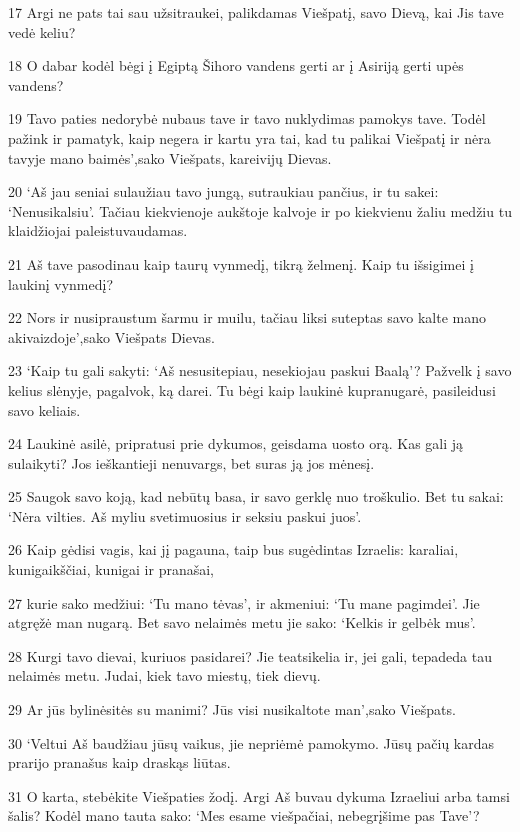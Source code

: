 \par 17 Argi ne pats tai sau užsitraukei, palikdamas Viešpatį, savo Dievą, kai Jis tave vedė keliu? 
\par 18 O dabar kodėl bėgi į Egiptą Šihoro vandens gerti ar į Asiriją gerti upės vandens? 
\par 19 Tavo paties nedorybė nubaus tave ir tavo nuklydimas pamokys tave. Todėl pažink ir pamatyk, kaip negera ir kartu yra tai, kad tu palikai Viešpatį ir nėra tavyje mano baimės’,­sako Viešpats, kareivijų Dievas. 
\par 20 ‘Aš jau seniai sulaužiau tavo jungą, sutraukiau pančius, ir tu sakei: ‘Nenusikalsiu’. Tačiau kiekvienoje aukštoje kalvoje ir po kiekvienu žaliu medžiu tu klaidžiojai paleistuvaudamas. 
\par 21 Aš tave pasodinau kaip taurų vynmedį, tikrą želmenį. Kaip tu išsigimei į laukinį vynmedį? 
\par 22 Nors ir nusipraustum šarmu ir muilu, tačiau liksi suteptas savo kalte mano akivaizdoje’,­sako Viešpats Dievas. 
\par 23 ‘Kaip tu gali sakyti: ‘Aš nesusitepiau, nesekiojau paskui Baalą’? Pažvelk į savo kelius slėnyje, pagalvok, ką darei. Tu bėgi kaip laukinė kupranugarė, pasileidusi savo keliais. 
\par 24 Laukinė asilė, pripratusi prie dykumos, geisdama uosto orą. Kas gali ją sulaikyti? Jos ieškantieji nenuvargs, bet suras ją jos mėnesį. 
\par 25 Saugok savo koją, kad nebūtų basa, ir savo gerklę nuo troškulio. Bet tu sakai: ‘Nėra vilties. Aš myliu svetimuosius ir seksiu paskui juos’. 
\par 26 Kaip gėdisi vagis, kai jį pagauna, taip bus sugėdintas Izraelis: karaliai, kunigaikščiai, kunigai ir pranašai, 
\par 27 kurie sako medžiui: ‘Tu mano tėvas’, ir akmeniui: ‘Tu mane pagimdei’. Jie atgręžė man nugarą. Bet savo nelaimės metu jie sako: ‘Kelkis ir gelbėk mus’. 
\par 28 Kurgi tavo dievai, kuriuos pasidarei? Jie teatsikelia ir, jei gali, tepadeda tau nelaimės metu. Judai, kiek tavo miestų, tiek dievų. 
\par 29 Ar jūs bylinėsitės su manimi? Jūs visi nusikaltote man’,­sako Viešpats. 
\par 30 ‘Veltui Aš baudžiau jūsų vaikus, jie nepriėmė pamokymo. Jūsų pačių kardas prarijo pranašus kaip draskąs liūtas. 
\par 31 O karta, stebėkite Viešpaties žodį. Argi Aš buvau dykuma Izraeliui arba tamsi šalis? Kodėl mano tauta sako: ‘Mes esame viešpačiai, nebegrįšime pas Tave’? 

